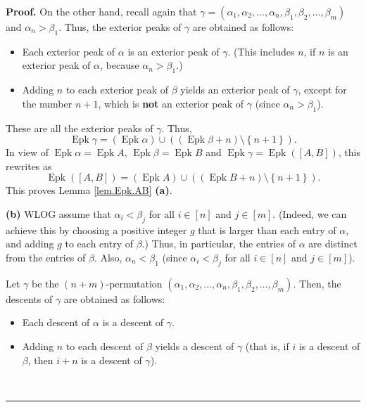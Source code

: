\documentclass[numbers=enddot,12pt,final,onecolumn,notitlepage]{scrartcl}%
\theoremstyle{definition}
\newenvironment{proof}[1][Proof]{\noindent\textbf{#1.} }{\ \rule{0.5em}{0.5em}}
\begin{document}
\begin{proof}
On the other hand, recall again that $\gamma=\left(  \alpha_{1},\alpha
_{2},\ldots,\alpha_{n},\beta_{1},\beta_{2},\ldots,\beta_{m}\right)  $ and
$\alpha_{n}>\beta_{1}$. Thus, the exterior peaks of $\gamma$ are obtained as follows:

\begin{itemize}
\item Each exterior peak of $\alpha$ is an exterior peak of $\gamma$. (This
includes $n$, if $n$ is an exterior peak of $\alpha$, because $\alpha
_{n}>\beta_{1}$.)

\item Adding $n$ to each exterior peak of $\beta$ yields an exterior peak of
$\gamma$, except for the number $n+1$, which is \textbf{not} an exterior peak
of $\gamma$ (since $\alpha_{n}>\beta_{1}$).
\end{itemize}

These are all the exterior peaks of $\gamma$. Thus,%
\[
\operatorname*{Epk}\gamma=\left(  \operatorname*{Epk}\alpha\right)
\cup\left(  \left(  \operatorname*{Epk}\beta+n\right)  \setminus\left\{
n+1\right\}  \right)  .
\]
In view of $\operatorname*{Epk}\alpha=\operatorname*{Epk}A$,
$\operatorname*{Epk}\beta=\operatorname*{Epk}B$ and $\operatorname*{Epk}%
\gamma=\operatorname*{Epk}\left(  \left[  A,B\right]  \right)  $, this
rewrites as
\[
\operatorname*{Epk}\left(  \left[  A,B\right]  \right)  =\left(
\operatorname*{Epk}A\right)  \cup\left(  \left(  \operatorname*{Epk}%
B+n\right)  \setminus\left\{  n+1\right\}  \right)  .
\]
This proves Lemma \ref{lem.Epk.AB} \textbf{(a)}.

\textbf{(b)} WLOG assume that $\alpha_{i}<\beta_{j}$ for all $i\in\left[
n\right]  $ and $j\in\left[  m\right]  $. (Indeed, we can achieve this by
choosing a positive integer $g$ that is larger than each entry of $\alpha$,
and adding $g$ to each entry of $\beta$.) Thus, in particular, the entries of
$\alpha$ are distinct from the entries of $\beta$. Also, $\alpha_{n}<\beta
_{1}$ (since $\alpha_{i}<\beta_{j}$ for all $i\in\left[  n\right]  $ and
$j\in\left[  m\right]  $).

Let $\gamma$ be the $\left(  n+m\right)  $-permutation $\left(  \alpha
_{1},\alpha_{2},\ldots,\alpha_{n},\beta_{1},\beta_{2},\ldots,\beta_{m}\right)
$. Then, the descents of $\gamma$ are obtained as follows:

\begin{itemize}
\item Each descent of $\alpha$ is a descent of $\gamma$.

\item Adding $n$ to each descent of $\beta$ yields a descent of $\gamma$ (that
is, if $i$ is a descent of $\beta$, then $i+n$ is a descent of $\gamma$).
\end{itemize}


\end{proof}
\end{document}

